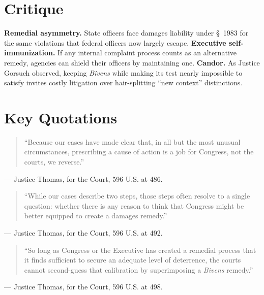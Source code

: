 \documentclass[12pt]{article}
\begin{document}
\section{Critique}

\textbf{Remedial asymmetry.} State officers face damages liability under \S~1983 for the same violations that federal officers now largely escape. \textbf{Executive self-immunization.} If any internal complaint process counts as an alternative remedy, agencies can shield their officers by maintaining one. \textbf{Candor.} As Justice Gorsuch observed, keeping \textit{Bivens} while making its test nearly impossible to satisfy invites costly litigation over hair-splitting ``new context'' distinctions.

\section{Key Quotations}

\begin{quote}
``Because our cases have made clear that, in all but the most unusual circumstances, prescribing a cause of action is a job for Congress, not the courts, we reverse.''
\end{quote}
\noindent --- Justice Thomas, for the Court, 596 U.S. at 486.

\begin{quote}
``While our cases describe two steps, those steps often resolve to a single question: whether there is any reason to think that Congress might be better equipped to create a damages remedy.''
\end{quote}
\noindent --- Justice Thomas, for the Court, 596 U.S. at 492.

\begin{quote}
``So long as Congress or the Executive has created a remedial process that it finds sufficient to secure an adequate level of deterrence, the courts cannot second-guess that calibration by superimposing a \textit{Bivens} remedy.''
\end{quote}
\noindent --- Justice Thomas, for the Court, 596 U.S. at 498.
\end{document}
